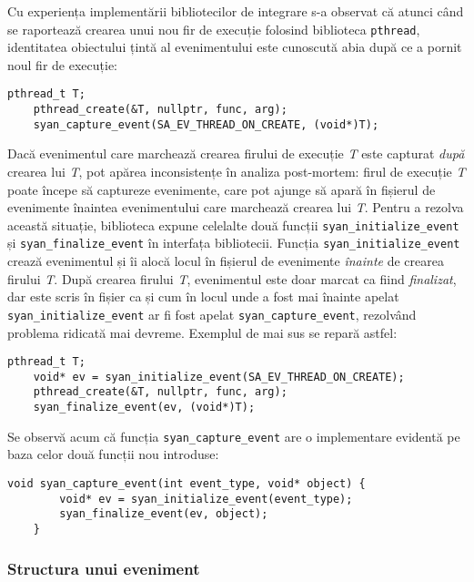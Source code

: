 Cu experiența implementării bibliotecilor de integrare s-a observat că
atunci când se raportează crearea unui nou fir de execuție folosind
biblioteca \lstinline{pthread}, identitatea obiectului țintă
al evenimentului este cunoscută abia după ce a pornit noul fir de
execuție:
\begin{lstlisting}[caption=Capturare incorectă a creării unui fir de
                           execuție]
    pthread_t T;
    pthread_create(&T, nullptr, func, arg);
    syan_capture_event(SA_EV_THREAD_ON_CREATE, (void*)T);
\end{lstlisting}
Dacă evenimentul care marchează crearea firului de execuție \textit{T}
este capturat \textit{după} crearea lui \textit{T}, pot apărea
inconsistențe în analiza post-mortem: firul de execuție \textit{T} poate
începe să captureze evenimente, care pot ajunge să apară în fișierul de
evenimente înaintea evenimentului care marchează crearea lui \textit{T}.
Pentru a rezolva această situație, biblioteca expune celelalte două
funcții \lstinline{syan_initialize_event} și
\lstinline{syan_finalize_event} în interfața bibliotecii.  Funcția
\lstinline{syan_initialize_event} crează evenimentul și îi alocă locul
în fișierul de evenimente \textit{înainte} de crearea firului
\textit{T}. După crearea firului \textit{T}, evenimentul este doar
marcat ca fiind \textit{finalizat}, dar este scris în fișier ca și cum
în locul unde a fost mai înainte apelat
\lstinline{syan_initialize_event} ar fi fost apelat
\lstinline{syan_capture_event}, rezolvând problema ridicată mai devreme.
Exemplul de mai sus se repară astfel:
\begin{lstlisting}[caption=Capturare corectă a creării unui fir de
                           execuție]
    pthread_t T;
    void* ev = syan_initialize_event(SA_EV_THREAD_ON_CREATE);
    pthread_create(&T, nullptr, func, arg);
    syan_finalize_event(ev, (void*)T);
\end{lstlisting}

Se observă acum că funcția \lstinline{syan_capture_event} are o
implementare evidentă pe baza celor două funcții nou introduse:
\begin{lstlisting}[caption=Implementarea funcției
                   \lstinline{syan_capture_event}]
    void syan_capture_event(int event_type, void* object) {
        void* ev = syan_initialize_event(event_type);
        syan_finalize_event(ev, object);
    }
\end{lstlisting}

\subsubsection{Structura unui eveniment}\label{section:event-structure}

